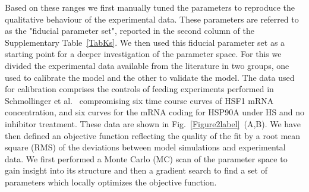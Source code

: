 \documentclass[oneside, 10pt, a4paper, twocolumn]{article}
\begin{document}
Based on these ranges 
we first manually tuned the parameters to reproduce the qualitative behaviour of the experimental data.
These parameters are referred to as the "fiducial parameter set", reported in the second column of the Supplementary Table~\ref{TabKs}.
We then used this fiducial parameter set as a starting point for a
deeper investigation of the parameter space. For this we divided the experimental data available from the literature in two
groups, one used to calibrate the model and the other to validate the model. The  data used for calibration comprises the controls of feeding
experiments performed in Schmollinger et al.~\cite{Schmollinger2013} compromising six time course curves
of HSF1 mRNA concentration, and six curves for the mRNA coding for HSP90A under HS and no inhibitor treatment. These data are shown in Fig.~\ref{Figure2label}~(A,B). 
We have then defined an objective function reflecting the quality of the fit by
a root mean square (RMS) of the deviations between model simulations and experimental 
data. We  first performed a
Monte Carlo (MC) scan of the parameter space to gain insight into its
structure and then a gradient search to find a set of parameters which
locally optimizes the objective function. 
\end{document}
